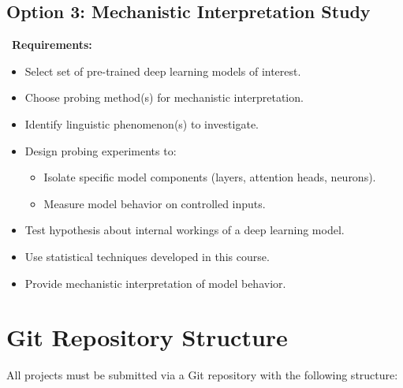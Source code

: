 \documentclass[10pt,letterpaper]{article}
\begin{document}
\subsection{Option 3: Mechanistic Interpretation Study}

\begin{graybox}
\faBrain\ \textbf{Requirements:}
\begin{itemize}
  \item Select set of pre-trained deep learning models of interest.
  \item Choose probing method(s) for mechanistic interpretation.
  \item Identify linguistic phenomenon(s) to investigate.
  \item Design probing experiments to:
    \begin{itemize}
      \item Isolate specific model components (layers, attention heads, neurons).
      \item Measure model behavior on controlled inputs.
    \end{itemize}
  \item Test hypothesis about internal workings of a deep learning model.
  \item Use statistical techniques developed in this course.
  \item Provide mechanistic interpretation of model behavior.
\end{itemize}
\end{graybox}

\section{Git Repository Structure}

All projects must be submitted via a Git repository with the following structure:
\end{document}
